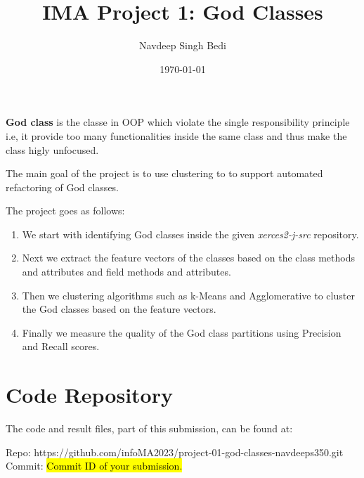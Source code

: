 \documentclass{article}
\title{IMA Project 1: God Classes}
\author{{Navdeep Singh Bedi} }
\date{\today}
\newcommand\templateInstruction[1]{
\hl{#1}
}
\begin{document}
\setcounter{section}{-1}

\maketitle



\textbf{God class} is the classe in OOP which violate the single responsibility principle i.e, it provide
too many functionalities inside the same class and thus make the class higly unfocused.

The main goal of the project is to use clustering to to support automated refactoring of God classes. 

The project goes as follows: 

\begin{enumerate}
    \item We start with identifying God classes inside the given \textit{xerces2-j-src} repository.
    \item Next we extract the feature vectors of the classes based on the class methods and attributes and field methods and attributes.
    \item Then we clustering algorithms such as k-Means and Agglomerative to cluster the God classes based on the feature vectors.
    \item Finally we measure the quality of the God class partitions using Precision and Recall scores.
\end{enumerate}

\section{Code Repository}

The code and result files, part of this submission, can be found at:

\begin{center}
    Repo: {https://github.com/infoMA2023/project-01-god-classes-navdeeps350.git} \\
    Commit: \templateInstruction{Commit ID of your submission.}
\end{center}
\end{document}
